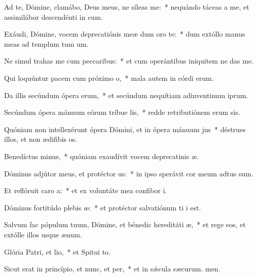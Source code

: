 \item Ad te, Dómine, clamábo, Deus meus, ne síleas  me:~* nequándo táceas a me, et assimilábor descendénti in cum.
\item Exáudi, Dómine, vocem deprecatiónis meæ dum oro  te:~* dum extóllo manus meas ad templum tum um.
\item Ne simul trahas me cum peccaribus:~* et cum operántibus iniquitem ne das me.
\item Qui loquúntur pacem cum próximo o,~* mala autem in córdi erum.
\item Da illis secúndum ópera erum,~* et secúndum nequítiam adinventinum iprum.
\item Secúndum ópera mánuum eórum tríbue lis,~* redde retributiónem erum sis.
\item Quóniam non intellexérunt ópera Dómini, et in ópera mánuum jus~* déstrues illos, et non ædifibis os.
\item Benedíctus minus,~* quóniam exaudívit vocem deprecatinis æ.
\item Dóminus adjútor meus, et protéctor us:~* in ipso sperávit cor meum  adtus sum.
\item Et reflóruit caro a:~* et ex voluntáte mea confibor i.
\item Dóminus fortitúdo plebis æ:~* et protéctor salvatiónum ti i est.
\item Salvum fac pópulum tuum, Dómine, et bénedic hereditáti æ,~* et rege eos, et extólle illos usque  ænum.
\item Glória Patri, et lio,~* et Spitui to.
\item Sicut erat in princípio, et nunc, et per,~* et in sǽcula sæcurum. men.
